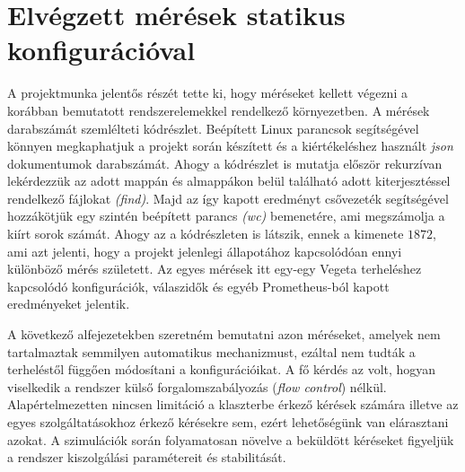 \section{Elvégzett mérések statikus konfigurációval}
A projektmunka jelentős részét tette ki, hogy méréseket kellett végezni a korábban bemutatott rendszerelemekkel rendelkező környezetben.
A mérések darabszámát szemlélteti  kódrészlet. Beépített Linux parancsok segítségével könnyen megkaphatjuk a projekt során készített és a kiértékeléshez használt \textit{json} dokumentumok darabszámát. Ahogy a kódrészlet is mutatja először rekurzívan lekérdezzük az adott mappán és almappákon belül található adott kiterjesztéssel rendelkező fájlokat \textit{(find)}. 
Majd az így kapott eredményt csővezeték segítségével hozzákötjük egy szintén beépített parancs \textit{(wc)} bemenetére, ami megszámolja a kiírt sorok számát. 
Ahogy az a kódrészleten is látszik, ennek a kimenete $1872$, ami azt jelenti, hogy a projekt jelenlegi állapotához kapcsolódóan ennyi különböző mérés született. 
Az egyes mérések itt egy-egy Vegeta terheléshez kapcsolódó konfigurációk, válaszidők és egyéb Prometheus-ból kapott eredményeket jelentik. \\

\lstset{caption=Elvégzett mérések száma, label=number_of_measurements}


A következő alfejezetekben szeretném bemutatni azon méréseket, amelyek nem tartalmaztak semmilyen automatikus mechanizmust, ezáltal nem tudták a terheléstől függően módosítani a konfigurációikat.
A fő kérdés az volt, hogyan viselkedik a rendszer külső forgalomszabályozás (\textit{flow control}) nélkül.
Alapértelmezetten nincsen limitáció a klaszterbe érkező kérések számára illetve az egyes szolgáltatásokhoz érkező kérésekre sem, ezért lehetőségünk van elárasztani azokat.
A szimulációk során folyamatosan növelve a beküldött kéréseket figyeljük a rendszer kiszolgálási paramétereit és stabilitását.

